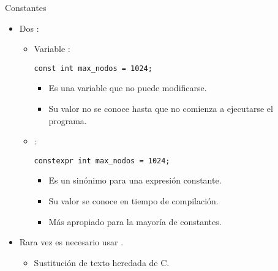 \begin{frame}[t,fragile]{Constantes}
\begin{itemize}
\item Dos :
  \begin{itemize}

    \item Variable :
\begin{lstlisting}
const int max_nodos = 1024;
\end{lstlisting}
      \begin{itemize}
        \item Es una variable que no puede modificarse.
        \item Su valor no se conoce hasta que no comienza a ejecutarse el programa.
      \end{itemize}

    \item {}:
\begin{lstlisting}
constexpr int max_nodos = 1024;
\end{lstlisting}
      \begin{itemize}
        \item Es un sinónimo para una expresión constante.
        \item Su valor se conoce en tiempo de compilación.
        \item Más apropiado para la mayoría de constantes.
      \end{itemize}
  \end{itemize}

  \item Rara vez es necesario usar .
    \begin{itemize}
      \item Sustitución de texto heredada de C.
    \end{itemize}
\end{itemize}
\end{frame}

